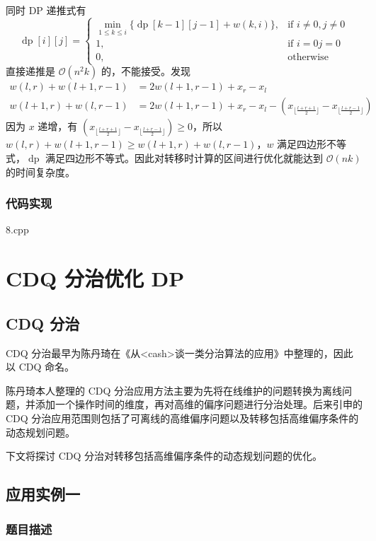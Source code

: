 \documentclass[a4paper, UTF8]{ctexart}
\begin{document}
同时 DP 递推式有 \[
\operatorname{dp}[i][j]=
\left\{
\begin{array}{ll}
\min\limits_{1\le k\le i}\{\operatorname{dp}[k-1][j-1]+w(k,i)\},&\text{if } i\neq0,j\neq0\\
1,&\text{if }i=0 j=0\\
0,&\text{otherwise}
\end{array}
\right.
\] 直接递推是 \(\mathcal{O}(n^2k)\) 的，不能接受。发现 \[
\begin{aligned}
w(l,r)+w(l+1,r-1)&=2w(l+1,r-1)+x_r-x_l\\
w(l+1,r)+w(l,r-1)&=2w(l+1,r-1)+x_r-x_l-(x_{\lfloor \frac{l+r+1}{2}\rfloor}-x_{\lfloor \frac{l+r-1}{2}\rfloor})
\end{aligned}
\] 因为 \(x\) 递增，有
\((x_{\lfloor \frac{l+r+1}{2}\rfloor}-x_{\lfloor \frac{l+r-1}{2}\rfloor})\ge0\)，所以
\(w(l,r)+w(l+1,r-1)\ge w(l+1,r)+w(l,r-1)\)，\(w\)
满足四边形不等式，\(\operatorname{dp}\)
满足四边形不等式。因此对转移时计算的区间进行优化就能达到
\(\mathcal{O}(nk)\) 的时间复杂度。

\subsubsection{代码实现}

8.cpp

\section{CDQ 分治优化 DP}

\subsection{CDQ 分治}

CDQ
分治最早为陈丹琦在《从\textless cash\textgreater 谈一类分治算法的应用》中整理的，因此以
CDQ 命名。

陈丹琦本人整理的 CDQ
分治应用方法主要为先将在线维护的问题转换为离线问题，并添加一个操作时间的维度，再对高维的偏序问题进行分治处理。后来引申的
CDQ
分治应用范围则包括了可离线的高维偏序问题以及转移包括高维偏序条件的动态规划问题。

下文将探讨 CDQ 分治对转移包括高维偏序条件的动态规划问题的优化。

\subsection{应用实例一}

\subsubsection{题目描述}
\end{document}
